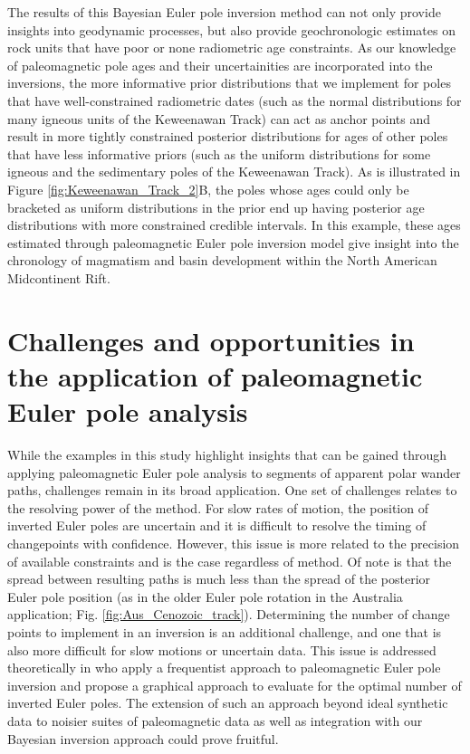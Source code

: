 \documentclass[]{agujournal2019}
\begin{document}
The results of this Bayesian Euler pole inversion method can not only provide insights into geodynamic processes, but also provide geochronologic estimates on rock units that have poor or none radiometric age constraints. As our knowledge of paleomagnetic pole ages and their uncertainities are incorporated into the inversions, the more informative prior distributions that we implement for poles that have well-constrained radiometric dates (such as the normal distributions for many igneous units of the Keweenawan Track) can act as anchor points and result in more tightly constrained posterior distributions for ages of other poles that have less informative priors (such as the uniform distributions for some igneous and the sedimentary poles of the Keweenawan Track). As is illustrated in Figure \ref{fig:Keweenawan_Track_2}B, the poles whose ages could only be bracketed as uniform distributions in the prior end up having posterior age distributions with more constrained credible intervals. In this example, these ages estimated through paleomagnetic Euler pole inversion model give insight into the chronology of magmatism and basin development within the North American Midcontinent Rift. 

\section*{Challenges and opportunities in the application of paleomagnetic Euler pole analysis}
\label{sec:challenges_and_opportunities}

While the examples in this study highlight insights that can be gained through applying paleomagnetic Euler pole analysis to segments of apparent polar wander paths, challenges remain in its broad application. One set of challenges relates to the resolving power of the method. For slow rates of motion, the position of inverted Euler poles are uncertain and it is difficult to resolve the timing of changepoints with confidence. However, this issue is more related to the precision of available constraints and is the case regardless of method. Of note is that the spread between resulting paths is much less than the spread of the posterior Euler pole position (as in the older Euler pole rotation in the Australia application; Fig. \ref{fig:Aus_Cenozoic_track}). Determining the number of change points to implement in an inversion is an additional challenge, and one that is also more difficult for slow motions or uncertain data. This issue is addressed theoretically in  who apply a frequentist approach to paleomagnetic Euler pole inversion and propose a graphical approach to evaluate for the optimal number of inverted Euler poles. The extension of such an approach beyond ideal synthetic data to noisier suites of paleomagnetic data as well as integration with our Bayesian inversion approach could prove fruitful. 
\end{document}
